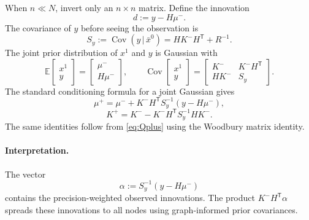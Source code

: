 \documentclass[11pt]{article}
\numberwithin{equation}{section}
\newcommand{\E}{\mathbb{E}}
\newcommand{\Cov}{\operatorname{Cov}}
\newcommand{\transpose}{^{\mathsf T}}
\newcommand{\given}{\,|\,}
\begin{document}
When $n\ll N$, invert only an $n\times n$ matrix.  Define the innovation
\begin{equation}
  d:=y-H\mu^-.
  \label{eq:innovation-d}
\end{equation}
The covariance of $y$ before seeing the observation is
\begin{equation}
  S_y:=\Cov(y\given \bar x^0)=HK^-H\transpose+R^{-1}.
  \label{eq:innovation-covariance-final}
\end{equation}
The joint prior distribution of $x^1$ and $y$ is Gaussian with
\begin{equation}
  \E\begin{bmatrix}x^1\\y\end{bmatrix}
  =\begin{bmatrix}\mu^-\\H\mu^-\end{bmatrix},
  \qquad
  \Cov\begin{bmatrix}x^1\\y\end{bmatrix}
  =\begin{bmatrix}
    K^-&K^-H\transpose\\
    HK^-&S_y
  \end{bmatrix}.
  \label{eq:joint-x-y}
\end{equation}
The standard conditioning formula for a joint Gaussian gives
\begin{equation}
  \boxed{
  \mu^+=\mu^-+K^-H\transpose S_y^{-1}(y-H\mu^-),}
  \label{eq:muplus-covariance}
\end{equation}
\begin{equation}
  \boxed{
  K^+=K^- - K^-H\transpose S_y^{-1}HK^-.}
  \label{eq:Kplus-covariance}
\end{equation}
The same identities follow from \eqref{eq:Qplus} using the Woodbury matrix identity.

\paragraph{Interpretation.}  The vector
\begin{equation}
  \alpha:=S_y^{-1}(y-H\mu^-)
  \label{eq:alpha-definition}
\end{equation}
contains the precision-weighted observed innovations.  The product $K^-H\transpose\alpha$ spreads these innovations to all nodes using graph-informed prior covariances.
\end{document}
